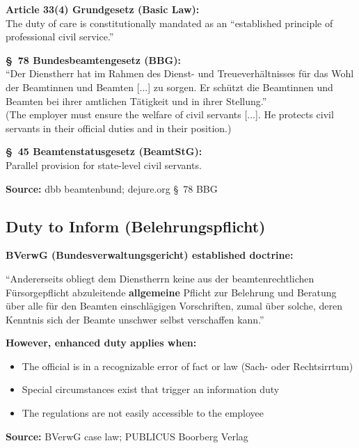 \documentclass[11pt,a4paper]{article}
\begin{document}
\begin{sourcebox}
\textbf{Article 33(4) Grundgesetz (Basic Law):}\\
The duty of care is constitutionally mandated as an ``established principle of professional civil service.''

\textbf{\S~78 Bundesbeamtengesetz (BBG):}\\
``Der Dienstherr hat im Rahmen des Dienst- und Treueverhältnisses für das Wohl der Beamtinnen und Beamten [...] zu sorgen. Er schützt die Beamtinnen und Beamten bei ihrer amtlichen Tätigkeit und in ihrer Stellung.''\\
(The employer must ensure the welfare of civil servants [...]. He protects civil servants in their official duties and in their position.)

\textbf{\S~45 Beamtenstatusgesetz (BeamtStG):}\\
Parallel provision for state-level civil servants.

\textbf{Source:} dbb beamtenbund; dejure.org \S~78 BBG
\end{sourcebox}

\subsection{Duty to Inform (Belehrungspflicht)}

\begin{sourcebox}
\textbf{BVerwG (Bundesverwaltungsgericht) established doctrine:}

``Andererseits obliegt dem Dienstherrn keine aus der beamtenrechtlichen Fürsorgepflicht abzuleitende \textbf{allgemeine} Pflicht zur Belehrung und Beratung über alle für den Beamten einschlägigen Vorschriften, zumal über solche, deren Kenntnis sich der Beamte unschwer selbst verschaffen kann.''

\textbf{However, enhanced duty applies when:}
\begin{itemize}[nosep]
    \item The official is in a recognizable error of fact or law (Sach- oder Rechtsirrtum)
    \item Special circumstances exist that trigger an information duty
    \item The regulations are not easily accessible to the employee
\end{itemize}

\textbf{Source:} BVerwG case law; PUBLICUS Boorberg Verlag
\end{sourcebox}
\end{document}
